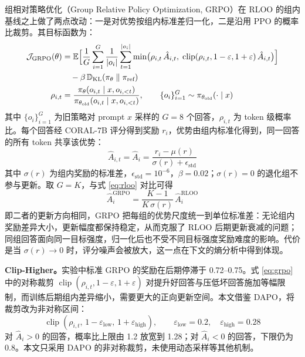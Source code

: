 \documentclass[fontset=fandol,type=master,campus=shenzhen,etitleauto=true]{hithesisbook}
\begin{document}
组相对策略优化（Group Relative Policy Optimization, GRPO）\cite{ref34}在 RLOO 的组内基线之上做了两点改动：一是对优势按组内标准差归一化，二是沿用 PPO 的概率比裁剪。其目标函数为：
\begin{equation}\label{eq:grpo}
\begin{aligned}
\mathcal{J}_{\text{GRPO}}(\theta) &= \mathbb{E} \Bigl[ \frac{1}{G}\sum_{i=1}^{G} \frac{1}{|o_i|}\sum_{t=1}^{|o_i|} \min\bigl( \rho_{i,t}\, \hat{A}_{i,t},\; \operatorname{clip}(\rho_{i,t}, 1-\varepsilon, 1+\varepsilon)\, \hat{A}_{i,t} \bigr) \Bigr] \\
&\quad - \beta\, \mathbb{D}_{\text{KL}}(\pi_\theta \parallel \pi_{\text{ref}}) \\
\rho_{i,t} &= \frac{\pi_\theta(o_{i,t} \mid x, o_{i,<t})}{\pi_{\theta_{\text{old}}}(o_{i,t} \mid x, o_{i,<t})}, \qquad \{o_i\}_{i=1}^{G} \sim \pi_{\theta_{\text{old}}}(\cdot \mid x)
\end{aligned}
\end{equation}
其中 $\{o_i\}_{i=1}^{G}$ 为旧策略对 prompt $x$ 采样的 $G = 8$ 个回答，$\rho_{i,t}$ 为 token 级概率比。每个回答经 CORAL-7B 评分得到奖励 $r_i$，优势由组内标准化得到，同一回答的所有 token 共享该优势：
\begin{equation}
\hat{A}_{i,t} = \hat{A}_i = \frac{r_i - \mu(r)}{\sigma(r) + \epsilon_{\text{std}}}
\end{equation}
其中 $\sigma(r)$ 为组内奖励的标准差，$\epsilon_{\text{std}} = 10^{-6}$，$\beta = 0.02$；$\sigma(r) = 0$ 的退化组不参与更新。取 $G = K$，与式 \eqref{eq:rloo} 对比可得
\begin{equation}\label{eq:rloo-grpo}
\hat{A}_i^{\text{GRPO}} = \frac{K - 1}{K\, \sigma(r)}\, \hat{A}_i^{\text{RLOO}}
\end{equation}
即二者的更新方向相同，GRPO 把每组的优势尺度统一到单位标准差：无论组内奖励差异大小，更新幅度都保持稳定，从而克服了 RLOO 后期更新衰减的问题；同组回答面向同一目标强度，归一化后也不受不同目标强度奖励难度的影响。代价是当 $\sigma(r) \to 0$ 时，评分噪声会被放大，这一点在下文的熵分析中得到体现。

\textbf{Clip-Higher。}实验中标准 GRPO 的奖励在后期停滞于 0.72--0.75。式 \eqref{eq:grpo} 中的对称裁剪 $\operatorname{clip}(\rho_{i,t}, 1-\varepsilon, 1+\varepsilon)$ 对提升好回答与压低坏回答施加等幅限制，而训练后期组内差异缩小，需要更大的正向更新空间。本文借鉴 DAPO\cite{ref35}，将裁剪改为非对称区间：
\begin{equation}\label{eq:clip-higher}
\operatorname{clip}(\rho_{i,t},\, 1 - \varepsilon_{\text{low}},\, 1 + \varepsilon_{\text{high}}), \qquad \varepsilon_{\text{low}} = 0.2, \quad \varepsilon_{\text{high}} = 0.28
\end{equation}
对 $\hat{A}_i > 0$ 的回答，概率比上限由 1.2 放宽到 1.28；对 $\hat{A}_i < 0$ 的回答，下限仍为 0.8。本文只采用 DAPO 的非对称裁剪，未使用动态采样等其他机制。
\end{document}
